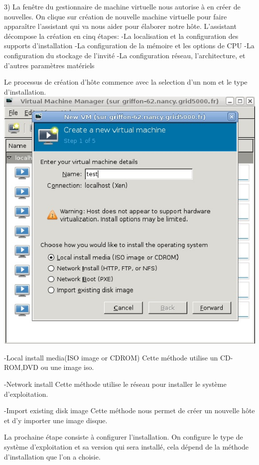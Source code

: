 3) La fenêtre du gestionnaire de machine virtuelle nous autorise à en créer de nouvelles.
On clique sur création de nouvelle machine virtuelle pour faire apparaître l'assistant qui va nous aider pour élaborer notre hôte.
L'assistant décompose la création en cinq étapes:
-La localisation et la configuration des supports d'installation
-La configuration de la mémoire et les options de CPU
-La configuration du stockage de l'invité
-La configuration réseau, l'architecture, et d'autres paramètres matériels

Le processus de création d'hôte commence avec la selection d'un nom et le type d'installation.
\includegraphics{images/nommachine.jpg}


-Local install media(ISO image or CDROM)
Cette méthode utilise un CD-ROM,DVD ou une image iso.

-Network install
Cette méthode utilise le réseau pour installer le système d'exploitation.

-Import existing disk image
Cette méthode nous permet de créer un nouvelle hôte et d'y importer une image disque.

La prochaine étape consiste à configurer l'installation.
On configure le type de système d'exploitation et sa version qui sera installé, cela dépend de la méthode d'installation que l'on a choisie.

